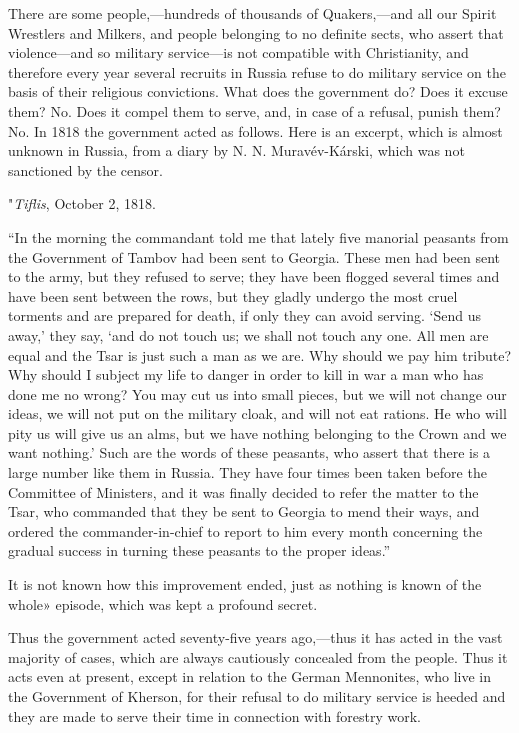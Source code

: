 \documentclass{book}
\begin{document}
There are some people,—hundreds of thousands of Quakers,—and all our Spirit Wrestlers and Milkers, and people belonging to no definite sects, who assert that violence—and so military service—is not compatible with Christianity, and therefore every year several recruits in Russia refuse to do military service on the basis of their religious convictions. What does the government do? Does it excuse them? No. Does it compel them to serve, and, in case of a refusal, punish them? No. In 1818 the government acted as follows. Here is an excerpt, which is almost unknown in Russia, from a diary by N. N. Muravév-Kárski, which was not sanctioned by the censor.

"\emph{Tiflis}, October 2, 1818.

“In the morning the commandant told me that lately five manorial peasants from the Government of Tambov had been sent to Georgia. These men had been sent to the army, but they refused to serve; they have been flogged several times and have been sent between the rows, but they gladly undergo the most cruel torments and are prepared for death, if only they can avoid serving. ‘Send us away,’ they say, ‘and do not touch us; we shall not touch any one. All men are equal and the Tsar is just such a man as we are. Why should we pay him tribute? Why should I subject my life to danger in order to kill in war a man who has done me no wrong? You may cut us into small pieces, but we will not change our ideas, we will not put on the military cloak, and will not eat rations. He who will pity us will give us an alms, but we have nothing belonging to the Crown and we want nothing.’ Such are the words of these peasants, who assert that there is a large number like them in Russia. They have four times been taken before the Committee of Ministers, and it was finally decided to refer the matter to the Tsar, who commanded that they be sent to Georgia to mend their ways, and ordered the commander-in-chief to report to him every month concerning the gradual success in turning these peasants to the proper ideas.”

It is not known how this improvement ended, just as nothing is known of the whole» episode, which was kept a profound secret.

Thus the government acted seventy-five years ago,—thus it has acted in the vast majority of cases, which are always cautiously concealed from the people. Thus it acts even at present, except in relation to the German Mennonites, who live in the Government of Kherson, for their refusal to do military service is heeded and they are made to serve their time in connection with forestry work.
\end{document}
